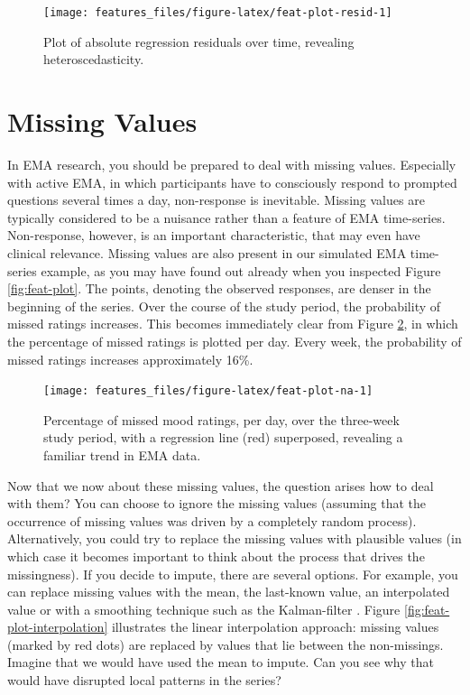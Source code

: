 \documentclass[]{book}
\begin{document}
\begin{figure}

{\centering \texttt{[image: features\_files/figure-latex/feat-plot-resid-1]} 

}

\caption{Plot of absolute regression residuals over time, revealing heteroscedasticity.}\label{fig:feat-plot-resid}
\end{figure}

\section{Missing Values}\label{missing-values}


In EMA research, you should be prepared to deal with missing values.
Especially with active EMA, in which participants have to consciously
respond to prompted questions several times a day, non-response is
inevitable. Missing values are typically considered to be a nuisance
rather than a feature of EMA time-series. Non-response, however, is an
important characteristic, that may even have clinical relevance. Missing
values are also present in our simulated EMA time-series example, as you
may have found out already when you inspected Figure
\ref{fig:feat-plot}. The points, denoting the observed responses, are
denser in the beginning of the series. Over the course of the study
period, the probability of missed ratings increases. This becomes
immediately clear from Figure \ref{fig:feat-plot-na}, in which the
percentage of missed ratings is plotted per day. Every week, the
probability of missed ratings increases approximately 16\%.

\begin{figure}

{\centering \texttt{[image: features\_files/figure-latex/feat-plot-na-1]} 

}

\caption{Percentage of missed mood ratings, per day, over the three-week study period, with a regression line (red) superposed, revealing a familiar trend in EMA data.}\label{fig:feat-plot-na}
\end{figure}

Now that we now about these missing values, the question arises how to
deal with them? You can choose to ignore the missing values (assuming
that the occurrence of missing values was driven by a completely random
process). Alternatively, you could try to replace the missing values
with plausible values (in which case it becomes important to think about
the process that drives the missingness). If you decide to impute, there
are several options. For example, you can replace missing values with
the mean, the last-known value, an interpolated value or with a
smoothing technique such as the Kalman-filter \citep[see][for a
discussion]{hoogendoorn2017}. Figure \ref{fig:feat-plot-interpolation}
illustrates the linear interpolation approach: missing values (marked by
red dots) are replaced by values that lie between the non-missings.
Imagine that we would have used the mean to impute. Can you see why that
would have disrupted local patterns in the series?
\end{document}
